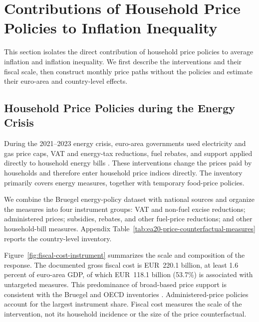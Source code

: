 \documentclass[11pt]{article}
\begin{document}
\section{Contributions of Household Price Policies to Inflation Inequality}
\label{sec:fiscal-policies}


This section isolates the direct contribution of household price policies to average inflation and
inflation inequality. We first describe the interventions and their fiscal scale, then construct
monthly price paths without the policies and estimate their euro-area and country-level effects.

\subsection{Household Price Policies during the Energy Crisis}
\label{sec:energy-price-policies}

During the 2021--2023 energy crisis, euro-area governments used electricity and gas price caps, VAT
and energy-tax reductions, fuel rebates, and support applied directly to household energy bills
\citep{arregui2022targeted,dao2023unconventional,garciaMiralles2023support}. These interventions
change the prices paid by households and therefore enter household price indices directly. The inventory primarily covers
energy measures, together with temporary food-price policies.

We combine the Bruegel energy-policy dataset \citep{sgaravatti2021national} with national sources and
organize the measures into four instrument groups: VAT and non-fuel excise reductions; administered
prices; subsidies, rebates, and other fuel-price reductions; and other household-bill measures.
Appendix Table~\ref{tab:ea20-price-counterfactual-measures} reports the country-level inventory.

Figure~\ref{fig:fiscal-cost-instrument} summarizes the scale and composition of the response. The
documented gross fiscal cost is EUR~220.1 billion, at least 1.6 percent of euro-area GDP, of which
EUR~118.1 billion (53.7\%) is associated with untargeted measures. This predominance of broad-based
price support is consistent with the Bruegel and OECD inventories
\citep{sgaravatti2021national,hemmerle2023aiming}. Administered-price policies account for the largest
instrument share. Fiscal cost measures the scale of the intervention, not its household incidence or
the size of the price counterfactual.
\end{document}

